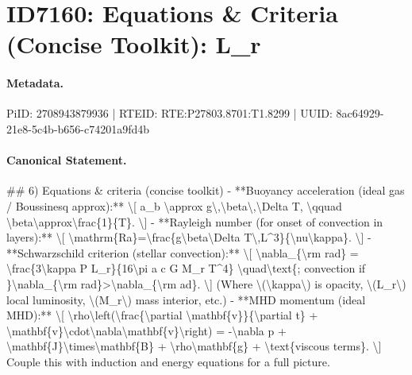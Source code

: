 \section*{ID7160: Equations \& Criteria (Concise Toolkit): L\_r}
\paragraph{Metadata.}
PiID: 2708943879936 | RTEID: RTE:P27803.8701:T1.8299 | UUID: 8ac64929-21e8-5c4b-b656-c74201a9fd4b

\paragraph{Canonical Statement.}
\#\# 6) Equations \& criteria (concise toolkit) - **Buoyancy acceleration (ideal gas / Boussinesq approx):** \textbackslash{}[ a\_b \textbackslash{}approx g\textbackslash{},\textbackslash{}beta\textbackslash{},\textbackslash{}Delta T, \textbackslash{}qquad \textbackslash{}beta\textbackslash{}approx\textbackslash{}frac\{1\}\{T\}. \textbackslash{}] - **Rayleigh number (for onset of convection in layers):** \textbackslash{}[ \textbackslash{}mathrm\{Ra\}=\textbackslash{}frac\{g\textbackslash{}beta\textbackslash{}Delta T\textbackslash{},L\textasciicircum{}3\}\{\textbackslash{}nu\textbackslash{}kappa\}. \textbackslash{}] - **Schwarzschild criterion (stellar convection):** \textbackslash{}[ \textbackslash{}nabla\_\{\textbackslash{}rm rad\} = \textbackslash{}frac\{3\textbackslash{}kappa P L\_r\}\{16\textbackslash{}pi a c G M\_r T\textasciicircum{}4\} \textbackslash{}quad\textbackslash{}text\{; convection if \}\textbackslash{}nabla\_\{\textbackslash{}rm rad\}>\textbackslash{}nabla\_\{\textbackslash{}rm ad\}. \textbackslash{}] (Where \textbackslash{}(\textbackslash{}kappa\textbackslash{}) is opacity, \textbackslash{}(L\_r\textbackslash{}) local luminosity, \textbackslash{}(M\_r\textbackslash{}) mass interior, etc.) - **MHD momentum (ideal MHD):** \textbackslash{}[ \textbackslash{}rho\textbackslash{}left(\textbackslash{}frac\{\textbackslash{}partial \textbackslash{}mathbf\{v\}\}\{\textbackslash{}partial t\} + \textbackslash{}mathbf\{v\}\textbackslash{}cdot\textbackslash{}nabla\textbackslash{}mathbf\{v\}\textbackslash{}right) = -\textbackslash{}nabla p + \textbackslash{}mathbf\{J\}\textbackslash{}times\textbackslash{}mathbf\{B\} + \textbackslash{}rho\textbackslash{}mathbf\{g\} + \textbackslash{}text\{viscous terms\}. \textbackslash{}] Couple this with induction and energy equations for a full picture.

